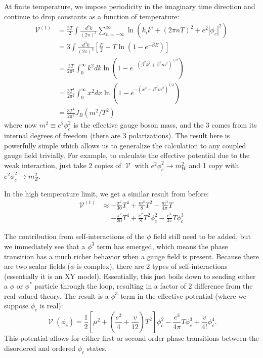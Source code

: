 \documentclass[%
 reprint,
nofootinbib,
 amsmath,amssymb,
 aps,
floatfix,
]{revtex4-1}
\DeclareMathOperator{\V}{\mathcal{V}}
\begin{document}
At finite temperature, we impose periodicity in the imaginary time direction and continue to drop constants as a function of temperature:
\begin{equation}
\begin{split}
    \V^{(1)} &= \frac{3T}{2} \int \frac{d^3k}{(2\pi)^3} \sum_{n=-\infty}^{\infty} \ln \left(k_ik^i + (2\pi n T)^2 + e^2|\phi_c|^2\right) \\
    &= 3 \int \frac{d^3k}{(2\pi)^3} \left[\frac{E}{2} + T \ln \left(1-e^{-\beta E}\right)\right] \\
    &= \frac{3T}{2\pi^2} \int_{0}^{\infty} k^2 dk \ln \left(1-e^{-(\beta^2k^2+\beta^2 m^2)^{1/2}} \right) \\
    &= \frac{3T^4}{2\pi^2} \int_{0}^{\infty} x^2 dx \ln \left(1-e^{-(x^2+\beta^2 m^2)^{1/2}} \right) \\
    &= \frac{3T^4}{2\pi^2} J_B (m^2/T^2)
\end{split}
\end{equation}
where now $m^2 \equiv e^2\phi_c^2$ is the effective gauge boson mass, and the 3 comes from its internal degrees of freedom (there are 3 polarizations). 
The result here is powerfully simple which allows us to generalize the calculation to any coupled gauge field trivially.
For example, to calculate the effective potential due to the weak interaction, just take 2 copies of $\V$ with $e^2\phi_c^2\rightarrow m_W^2$ and 1 copy with $e^2\phi_c^2\rightarrow m_Z^2$.

In the high temperature limit, we get a similar result from before:
\begin{equation}
\begin{split}
    \V^{(1)} &\approx -\frac{\pi^2}{30}T^4+\frac{m^2}{8}T^2-\frac{m^3}{4\pi}T \\
    &= -\frac{\pi^2}{30}T^4 + \frac{e^2}{8}T^2\phi_c^2 - \frac{e^3}{4\pi}T \phi_c^3
\end{split}
\end{equation}

The contribution from self-interactions of the $\phi$ field still need to be added, but we immediately see that a $\phi^3$ term has emerged, which means the phase transition has a much richer behavior when a gauge field is present.
Because there are two scalar fields ($\phi$ is complex), there are 2 types of self-interactions (essentially it is an XY model).
Essentially, this just boils down to sending either a $\phi$ or $\phi^*$ particle through the loop, resulting in a factor of $2$ difference from the real-valued theory.
The result is a $\phi^3$ term in the effective potential (where we suppose $\phi_c$ is real):
\begin{equation}
    \V (\phi_c) = \frac{1}{2}\left[\mu^2 + \left(\frac{e^2}{4} + \frac{v}{12}\right)T^2\right]\phi_c^2 - \frac{e^3}{4\pi}T\phi_c^3 + \frac{v}{4!}\phi_c^4.
\end{equation}
This potential allows for either first or second order phase transitions between the disordered and ordered $\phi_c$ states.
\end{document}
